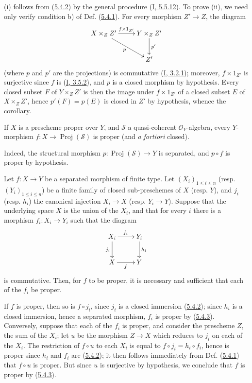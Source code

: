 (i) follows from (\hyperref[II.5.4.2]{5.4.2}) by the general procedure
(\hyperref[I.5.5.12]{I, 5.5.12}). To prove (ii), we need only
verify condition b) of Def. (\hyperref[II.5.4.1]{5.4.1}).
For every morphism $Z'\to Z$, the diagram
\[
  \xymatrix{
    X\times_ZZ'\ar[r]^{f\times1_{Z'}}\ar[dr]_p &
    Y\times_ZZ'\ar[d]^{p'}\\
    & Z'
  }
\]
(where $p$ and $p'$ are the projections) is commutative
(\hyperref[I.3.2.1]{I, 3.2.1}); moreover, $f\times1_{Z'}$ is surjective
since $f$ is (\hyperref[I.3.5.2]{I, 3.5.2}), and $p$ is
a closed morphism by hypothesis. Every closed subset $F$ of
$Y\times_ZZ'$ is then the image under $f\times1_{Z'}$ of a closed subset $E$
of $X\times_ZZ'$, hence $p'(F)=p(E)$ is closed in $Z'$ by hypothesis, whence
the corollary.

\begin{corollary}[5.4.4]
\label{II.5.4.4}
If $X$ is a prescheme proper over $Y$, and $\mathcal{S}$ a
quasi-coherent $\mathcal{O}_Y$-algebra, every $Y$-morphism
$f:X\to\operatorname{Proj}(\mathcal{S})$ is proper (and \emph{a fortiori}
closed).
\end{corollary}

Indeed, the structural morphism
$p:\operatorname{Proj}(\mathcal{S})\to Y$ is separated, and $p\circ f$ is
proper by hypothesis.

\begin{corollary}[5.4.5]
\label{II.5.4.5}
Let $f:X\to Y$ be a separated morphism of finite type. Let
$(X_i)_{1\leq i\leq n}$ (resp. $(Y_i)_{1\leq i\leq n}$) be a finite family
of closed sub-preschemes of $X$ (resp. $Y$), and $j_i$ (resp. $h_i$)
the canonical injection $X_i\to X$ (resp. $Y_i\to Y$). Suppose that the
underlying space $X$ is the union of the $X_i$, and that for every $i$ there
is a morphism $f_i:X_i\to Y_i$ such that the diagram
\[
  \xymatrix{
    X_i\ar[r]^{f_i}\ar[d]_{j_i} & Y_i\ar[d]^{h_i}\\
    X\ar[r]_f & Y
  }
\]
is commutative. Then, for $f$ to be proper, it is necessary and sufficient
that each of the $f_i$ be proper.
\end{corollary}


If $f$ is proper, then so is $f\circ j_i$, since $j_i$ is a
closed immersion (\hyperref[II.5.4.2]{5.4.2}); since $h_i$ is a
closed immersion, hence a separated morphism, $f_i$ is proper by
(\hyperref[II.5.4.3]{5.4.3}). Conversely, suppose that each of the $f_i$
is proper, and consider the prescheme $Z$, the sum of the $X_i$; let $u$ be
the morphism $Z\to X$ which reduces to $j_i$ on each of the $X_i$. The
restriction of $f\circ u$ to each $X_i$ is equal to
$f\circ j_i=h_i\circ f_i$, hence is proper since $h_i$
and $f_i$ are (\hyperref[II.5.4.2]{5.4.2}); it then follows immediately
from Def. (\hyperref[II.5.4.1]{5.4.1}) that $f\circ u$ is proper. But
since $u$ is surjective by hypothesis, we conclude that $f$ is proper by
(\hyperref[II.5.4.3]{5.4.3}).

